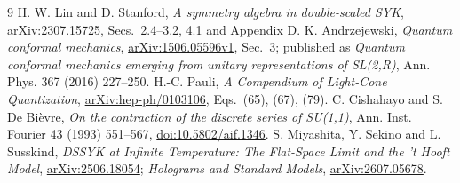 \documentclass[11pt,a4paper]{article}
\begin{document}
\begin{thebibliography}{9}
 H. W. Lin and D. Stanford, \emph{A symmetry algebra in
double-scaled SYK}, \href{https://arxiv.org/abs/2307.15725}{arXiv:2307.15725},
Secs.~2.4--3.2, 4.1 and Appendix D.
 K. Andrzejewski, \emph{Quantum conformal mechanics},
\href{https://arxiv.org/abs/1506.05596}{arXiv:1506.05596v1}, Sec.~3;
published as \emph{Quantum conformal mechanics emerging from unitary
representations of SL(2,R)}, Ann. Phys. 367 (2016) 227--250.
 H.-C. Pauli, \emph{A Compendium of Light-Cone Quantization},
\href{https://arxiv.org/abs/hep-ph/0103106}{arXiv:hep-ph/0103106},
Eqs.~(65), (67), (79).
 C. Cishahayo and S. De Bi\`evre,
\emph{On the contraction of the discrete series of SU(1,1)},
Ann. Inst. Fourier 43 (1993) 551--567,
\href{https://doi.org/10.5802/aif.1346}{doi:10.5802/aif.1346}.
 S. Miyashita, Y. Sekino and L. Susskind,
\emph{DSSYK at Infinite Temperature: The Flat-Space Limit and the 't Hooft Model},
\href{https://arxiv.org/abs/2506.18054}{arXiv:2506.18054};
\emph{Holograms and Standard Models},
\href{https://arxiv.org/abs/2607.05678}{arXiv:2607.05678}.
\end{thebibliography}
\end{document}
